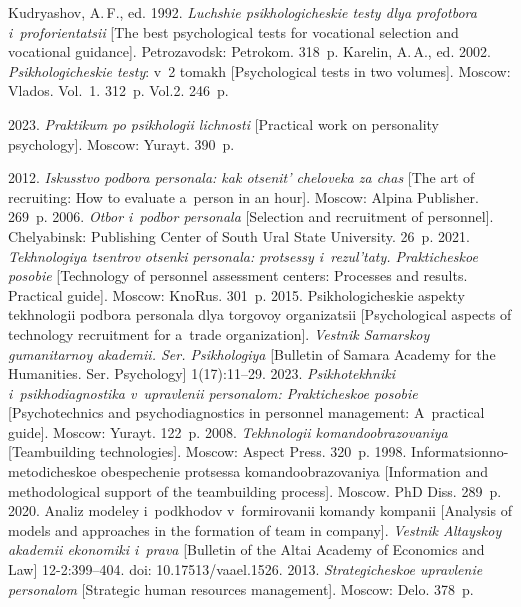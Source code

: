 \begin{multicols}{2}
{{\begin{thebibliography}{99}
   Kudryashov, A.\,F., ed. 1992. \textit{Luch\-shie psi\-kho\-lo\-gi\-che\-skie tes\-ty dlya prof\-ot\-bo\-ra 
i~prof\-ori\-en\-ta\-tsii} [The best psychological tests for vocational selection and vocational guidance]. 
Petrozavodsk: Petrokom. 318~p.
   Karelin, A.\,A., ed. 2002. \textit{Psi\-kho\-lo\-gi\-che\-skie tes\-ty}: v~2 tomakh [Psychological tests in 
two volumes]. Moscow: Vlados. Vol.~1. 312~p. Vol.2. 246~p.

    2023. \textit{Prak\-ti\-kum po psi\-kho\-lo\-gii lich\-nosti} 
[Practical work on personality psychology]. Moscow: 
Yurayt. 390~p.

    2012. \textit{Is\-kus\-stvo pod\-bo\-ra per\-so\-na\-la: kak otse\-nit' che\-lo\-ve\-ka za 
chas} [The art of recruiting: How to evaluate a~person in an hour]. Moscow: Alpina Publisher. 
269~p.
    2006. \textit{Ot\-bor i~pod\-bor personala} [Selection 
and recruitment of personnel]. Chelyabinsk: Publishing Center of South Ural State 
University. 26~p.
    2021. \textit{Tekh\-no\-lo\-giya tsent\-rov otsen\-ki per\-so\-na\-la: pro\-tses\-sy 
i~re\-zul'\-ta\-ty. Prakticheskoe posobie} [Technology of personnel assessment centers: Processes and 
results. Practical guide]. Moscow: KnoRus. 301~p.
    2015. Psi\-kho\-lo\-gi\-che\-skie as\-pek\-ty tekh\-no\-lo\-gii pod\-bo\-ra per\-so\-na\-la 
dlya tor\-go\-voy or\-ga\-ni\-za\-tsii [Psychological aspects of technology recruitment for a~trade 
organization]. \textit{Vest\-nik Sa\-mar\-skoy gu\-ma\-ni\-tar\-noy aka\-de\-mii. Ser. Psi\-kho\-lo\-giya} [Bulletin of 
Samara Academy for the Humanities. Ser. Psychology] 1(17):11--29.
    2023. \textit{Psi\-kho\-tekh\-ni\-ki i~psi\-kho\-diag\-no\-sti\-ka v~uprav\-le\-nii 
per\-so\-na\-lom: Prakticheskoe posobie} [Psychotechnics and psychodiagnostics in personnel 
management: A~practical guide]. Moscow: Yurayt. 122~p.
    2008. \textit{Tekh\-no\-lo\-gii 
ko\-man\-do\-ob\-ra\-zo\-va\-niya} [Teambuilding technologies]. Moscow: Aspect Press. 320~p.
    1998. Informatsionno-metodicheskoe obes\-pe\-che\-nie pro\-tses\-sa 
ko\-man\-do\-ob\-ra\-zo\-va\-niya [Information and methodological support of the teambuilding process]. 
Moscow. PhD Diss. 289~p.
    2020. Ana\-liz mo\-de\-ley i~pod\-kho\-dov v~for\-mi\-ro\-vanii ko\-man\-dy kom\-pa\-nii 
[Analysis of models and approaches in the formation of team in company]. \textit{Vest\-nik Al\-tay\-skoy 
aka\-de\-mii eko\-no\-mi\-ki i~pra\-va} [Bulletin of the Altai Academy of Economics and Law]  
12-2:399--404. doi: 10.17513/vaael.1526.
    2013. \textit{Stra\-te\-gi\-che\-skoe uprav\-le\-nie per\-so\-na\-lom} 
   [Strategic human resources management]. Moscow: Delo. 378~p.
   \end{thebibliography}

}}
\end{multicols}
